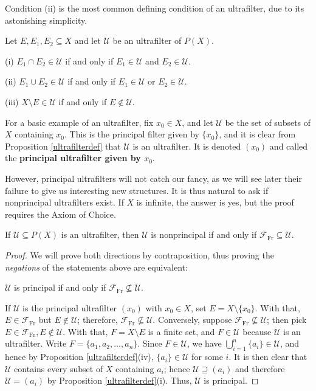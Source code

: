 \documentclass{article}
\def\Frec{\mathscr F_{\mathrm{Fr}}}
\def\U{\mathscr U}
\begin{document}
\noindent Condition (ii) is the most common defining condition of an ultrafilter, due to its astonishing simplicity.
\begin{exercise}\label{ultrabasics}
Let $E,E_1,E_2\subseteq X$ and let $\U$ be an ultrafilter of $P(X)$.

(i) $E_1\cap E_2\in\U$ if and only if $E_1\in\U$ and $E_2\in\U$.

(ii) $E_1\cup E_2\in\U$ if and only if $E_1\in\U$ or $E_2\in\U$.

(iii) $X\setminus E\in\U$ if and only if $E\notin\U$.
\end{exercise}
\noindent For a basic example of an ultrafilter, fix $x_0\in X$, and let $\U$ be the set of subsets of $X$ containing $x_0$.  This is the principal filter given by $\{x_0\}$, and it is clear from Proposition \ref{ultrafilterdef} that $\U$ is an ultrafilter.  It is denoted $(x_0)$ and called the \textbf{principal ultrafilter given by $x_0$}.

However, principal ultrafilters will not catch our fancy, as we will see later their failure to give us interesting new structures.  It is thus natural to ask if nonprincipal ultrafilters exist.  If $X$ is infinite, the answer is yes, but the proof requires the Axiom of Choice.
\begin{lemma}\label{freeultrafilter}
If $\U\subseteq P(X)$ is an ultrafilter, then $\U$ is nonprincipal if and only if $\Frec\subseteq\U$.
\end{lemma}
\begin{proof}
We will prove both directions by contraposition, thus proving the \emph{negations} of the statements above are equivalent:
\begin{center}
$\U$ is principal if and only if $\Frec\not\subseteq\U$.
\end{center}
If $\U$ is the principal ultrafilter $(x_0)$ with $x_0\in X$, set $E=X\setminus\{x_0\}$.  With that, $E\in\Frec$ but $E\notin\U$; therefore, $\Frec\not\subseteq\U$.  Conversely, suppose $\Frec\not\subseteq\U$; then pick $E\in\Frec,E\notin\U$.  With that, $F=X\setminus E$ is a finite set, and $F\in\U$ because $\U$ is an ultrafilter.  Write $F=\{a_1,a_2,\dots,a_n\}$.  Since $F\in\U$, we have $\bigcup_{i=1}^n\{a_i\}\in\U$, and hence by Proposition \ref{ultrafilterdef}(iv), $\{a_i\}\in\U$ for some $i$.  It is then clear that $\U$ contains every subset of $X$ containing $a_i$; hence $\U\supseteq(a_i)$ and therefore $\U=(a_i)$ by Proposition \ref{ultrafilterdef}(i).  Thus, $\U$ is principal.
\end{proof}
\end{document}

